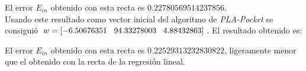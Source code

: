 \documentclass{article}
\begin{document}
\begin{figure}[H]
  \centering
\end{figure}

El error $E_{in}$ obtenido con esta recta es $0.22780569514237856$.\\

Usando este resultado como vector inicial del algoritmo de \textit{PLA-Pocket} se consiguió $w = [-6.50676351 \hspace{3mm} 94.33278003  \hspace{3mm} 4.88432863]$. El resultado obtenido es:

\begin{figure}[H]
  \centering
\end{figure}

El error $E_{in}$ obtenido con esta recta es $0.22529313232830822$, ligeramente menor que el obtenido con la recta de la regresión lineal.\\
\end{document}
